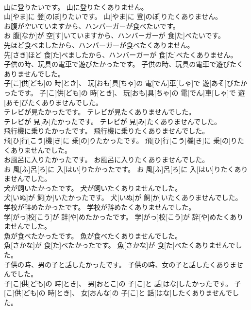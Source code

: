 \documentclass[8pt]{extreport}
\begin{document}
\begin{CJK}{UTF8}{min}
\\	山に登りたいです。 山に登りたくありません。	
\\	山[やま]に 登[のぼ]りたいです。 山[やま]に 登[のぼ]りたくありません。
\\	お腹が空いていますから、ハンバーガーが食べたいです。	
\\	お 腹[なか]が 空[す]いていますから、ハンバーガーが 食[た]べたいです。
\\	先ほど食べましたから、ハンバーガーが食べたくありません。	
\\	先[さき]ほど 食[た]べましたから、ハンバーガーが 食[た]べたくありません。
\\	子供の時、玩具の電車で遊びたかったです。 子供の時、玩具の電車で遊びたくありませんでした。	
\\	子[こ]供[ども]の 時[とき]、 玩[おも]具[ちゃ]の 電[でん]車[しゃ]で 遊[あそ]びたかったです。 子[こ]供[ども]の 時[とき]、 玩[おも]具[ちゃ]の 電[でん]車[しゃ]で 遊[あそ]びたくありませんでした。
\\	テレビが見たかったです。 テレビが見たくありませんでした。	
\\	テレビが 見[み]たかったです。 テレビが 見[み]たくありませんでした。
\\	飛行機に乗りたかったです。 飛行機に乗りたくありませんでした。	
\\	飛[ひ]行[こう]機[き]に 乗[の]りたかったです。 飛[ひ]行[こう]機[き]に 乗[の]りたくありませんでした。
\\	お風呂に入りたかったです。 お風呂に入りたくありませんでした。	
\\	お 風[ふ]呂[ろ]に 入[はい]りたかったです。 お 風[ふ]呂[ろ]に 入[はい]りたくありませんでした。
\\	犬が飼いたかったです。 犬が飼いたくありませんでした。	
\\	犬[いぬ]が 飼[か]いたかったです。 犬[いぬ]が 飼[か]いたくありませんでした。
\\	学校が辞めたかったです。 学校が辞めたくありませんでした。	
\\	学[がっ]校[こう]が 辞[や]めたかったです。 学[がっ]校[こう]が 辞[や]めたくありませんでした。
\\	魚が食べたかったです。 魚が食べたくありませんでした。	
\\	魚[さかな]が 食[た]べたかったです。 魚[さかな]が 食[た]べたくありませんでした。
\\	子供の時、男の子と話したかったです。 子供の時、女の子と話したくありませんでした。	
\\	子[こ]供[ども]の 時[とき]、 男[おとこ]の 子[こ]と 話[はな]したかったです。 子[こ]供[ども]の 時[とき]、 女[おんな]の 子[こ]と 話[はな]したくありませんでした。

\end{CJK}
\end{document}
